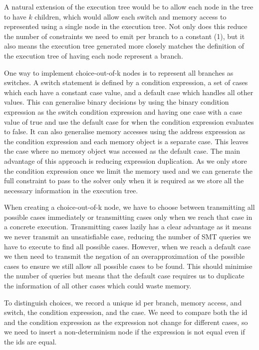 \documentclass[12pt,twoside]{report}
\begin{document}
A natural extension of the execution tree would be to allow each node in the tree to have $k$ children, which would allow each switch and memory access to represented using a single node in the execution tree. Not only does this reduce the number of constraints we need to emit per branch to a constant (1), but it also means the execution tree generated more closely matches the definition of the execution tree of having each node represent a branch.

One way to implement choice-out-of-k nodes is to represent all branches as switches. A switch statement is defined by a condition expression, a set of cases which each have a constant case value, and a default case which handles all other values. This can generalise binary decisions by using the binary condition expression as the switch condition expression and having one case with a case value of true and use the default case for when the condition expression evaluates to false. It can also generalise memory accesses using the address expression as the condition expression and each memory object is a separate case. This leaves the case where no memory object was accessed as the default case. The main advantage of this approach is reducing expression duplication. As we only store the condition expression once we limit the memory used and we can generate the full constraint to pass to the solver only when it is required as we store all the necessary information in the execution tree.

When creating a choice-out-of-k node, we have to choose between transmitting all possible cases immediately or transmitting cases only when we reach that case in a concrete execution. Transmitting cases lazily has a clear advantage as it means we never transmit an unsatisfiable case, reducing the number of SMT queries we have to execute to find all possible cases. However, when we reach a default case we then need to transmit the negation of an overapproximation of the possible cases to ensure we still allow all possible cases to be found. This should minimise the number of queries but means that the default case requires us to duplicate the information of all other cases which could waste memory.

To distinguish choices, we record a unique id per branch, memory access, and switch, the condition expression, and the case. We need to compare both the id and the condition expression as the expression not change for different cases, so we need to insert a non-determinism node if the expression is not equal even if the ids are equal.
\end{document}
